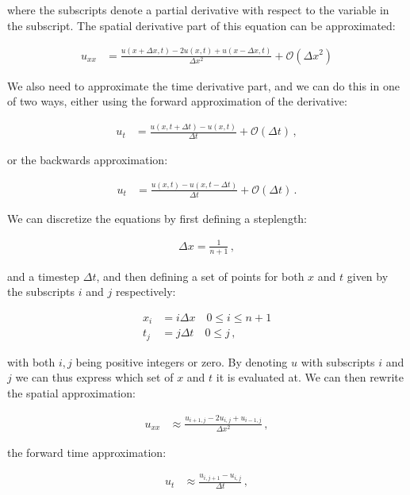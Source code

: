 \documentclass[reprint,english,notitlepage]{revtex4-1}  %
\begin{document}
where the subscripts denote a partial derivative with respect to the variable in the subscript. The spatial derivative part of this equation can be approximated:

\begin{align*}
u_{xx} &= \frac{u(x + \Delta x,t) - 2u(x,t) + u(x-\Delta x,t)}{\Delta x^2} + \mathcal{O}(\Delta x^2)
\end{align*}

We also need to approximate the time derivative part, and we can do this in one of two ways, either using the forward approximation of the derivative:

\begin{align*}
u_t &= \frac{u(x,t+\Delta t) - u(x,t)}{\Delta t} + \mathcal{O}(\Delta t) \, ,
\end{align*}

or the backwards approximation:

\begin{align*}
u_t &= \frac{u(x,t) - u(x,t-\Delta t)}{\Delta t} + \mathcal{O}(\Delta t) \, .
\end{align*}

We can discretize the equations by first defining a steplength:

\begin{align*}
\Delta x = \frac{1}{n+1} \, ,
\end{align*}

and a timestep $\Delta t$, and then defining a set of points for both $x$ and $t$ given by the subscripts $i$ and $j$ respectively:

\begin{align*}
x_i &= i \Delta x \quad 0 \leq i \leq n+1 \\
t_j &= j \Delta t \quad 0 \leq j \, ,
\end{align*}

with both $i,j$ being positive integers or zero. By denoting $u$ with subscripts $i$ and $j$ we can thus express which set of $x$ and $t$ it is evaluated at. We can then rewrite the spatial approximation:

\begin{align*}
u_{xx} &\approx \frac{u_{i+1,j} - 2u_{i,j} + u_{i-1,j}}{\Delta x^2} \, ,
\end{align*}

the forward time approximation:

\begin{align*}
u_t &\approx \frac{u_{i,j+1} - u_{i,j}}{\Delta t} \, ,
\end{align*}
\end{document}
